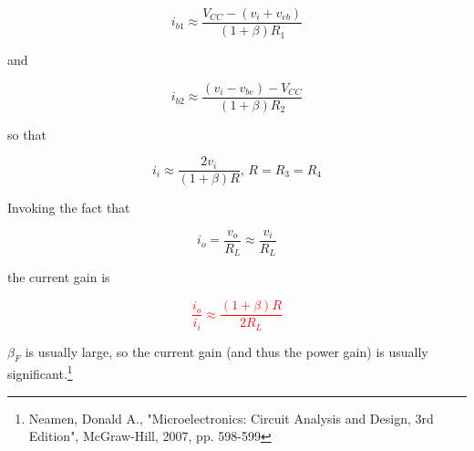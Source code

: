 \begin{equation}
i_{b1} \approx \frac{V_{CC}-(v_{i}+v_{eb})}{(1+\beta)R_{1}}
\end{equation}

and

\begin{equation}
i_{b2} \approx \frac{(v_{i}-v_{be})-V_{CC}}{(1+\beta)R_{2}}
\end{equation}

so that

\begin{equation}
i_{i} \approx \frac{2v_{i}}{(1+\beta)R}\text{, }R = R_{3} = R_{4}
\end{equation}

Invoking the fact that

\begin{equation}
i_{o} = \frac{v_{o}}{R_{L}} \approx \frac{v_{i}}{R_{L}}
\end{equation}

the current gain is

\textcolor{red}{
\begin{equation}
\frac{i_{o}}{i_{i}} \approx \frac{(1+\beta)R}{2R_{L}}
\end{equation}
}

$\beta_{F}$ is usually large, so the current gain (and thus the power gain) is usually significant.\footnote{Neamen, Donald A., "Microelectronics: Circuit Analysis and Design, 3rd Edition", McGraw-Hill, 2007, pp. 598-599}

